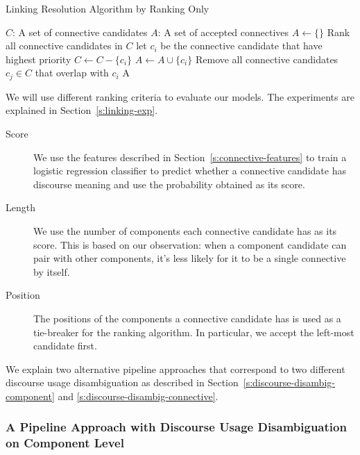 \begin{algorithm}
    \caption{Linking Resolution Algorithm by Ranking Only}
    \label{a:linking-rank}
    \begin{algorithmic}[1]
        \Require
            $C$: A set of connective candidates
        \Ensure
            $A$: A set of accepted connectives
        \State $A \gets \{\}$
        \State Rank all connective candidates in $ C $
            \State let $ c_i $ be the connective candidate that have highest priority
            \State $C \gets C - \{c_i\}$
            \State $A \gets A \cup \{c_i\}$
            \State Remove all connective candidates $ c_j \in C $ that overlap with $ c_i $
        \EndWhile
        \State \Return A
    \end{algorithmic}
\end{algorithm}

We will use different ranking criteria to evaluate our models. The experiments are
explained in Section~\ref{s:linking-exp}.

\begin{description}
\item[Score] We use the features described in Section~\ref{s:connective-features} to
    train a logistic regression classifier to predict whether a connective candidate
    has discourse meaning and use the probability obtained as its score.

\item[Length] We use the number of components each connective candidate has as its
    score. This is based on our observation: when a component candidate can
    pair with other components, it's less likely for it to be a single connective by
    itself.

\item[Position] The positions of the components a connective candidate has is used
    as a tie-breaker for the ranking algorithm. In particular, we accept the left-most
    candidate first.
\end{description}

We explain two alternative pipeline approaches that correspond to two different
discourse usage disambiguation as described in Section~\ref{s:discourse-disambig-component}
and \ref{s:discourse-disambig-connective}.

\subsubsection{A Pipeline Approach with Discourse Usage Disambiguation on Component Level}
\label{s:pipeline1}

